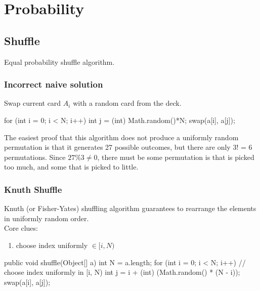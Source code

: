 \chapter{Probability}


\section{Shuffle}
Equal probability shuffle algorithm.

\subsection{Incorrect naive solution}
Swap current card $A_i$ with a random card from the deck. 
\begin{java}
for (int i = 0; i < N; i++) {
   int j = (int) Math.random()*N;
   swap(a[i], a[j]);
}
\end{java}
The easiest proof that this algorithm does not produce a uniformly random permutation is that it generates 27 possible outcomes, but there are only 3! = 6 permutations. Since $27\%3 \neq 0$, there must be some permutation is that is picked too much, and some that is picked to little.
\subsection{Knuth Shuffle}
Knuth (or Fisher-Yates) shuffling algorithm guarantees to rearrange the elements in uniformly random order. 
\\
Core clues:
\begin{enumerate}
\item choose index uniformly $\in [i, N)$
\end{enumerate}
\begin{java}
public void shuffle(Object[] a) {
    int N = a.length;
    for (int i = 0; i < N; i++) {
        // choose index uniformly in [i, N)
        int j = i + (int) (Math.random() * (N - i));
        swap(a[i], a[j]);
    }
}
\end{java}

